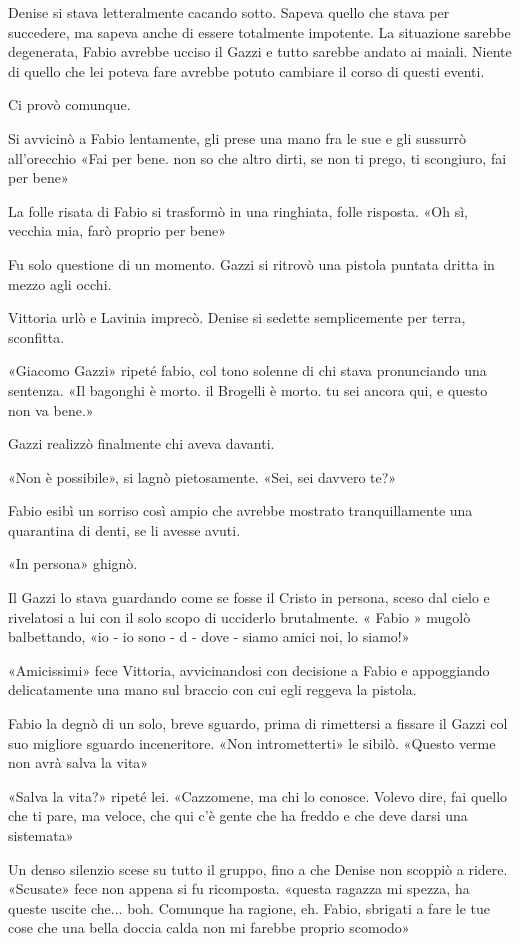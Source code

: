 Denise si stava letteralmente cacando sotto. Sapeva quello che stava per succedere, ma sapeva anche di essere totalmente impotente. La situazione sarebbe degenerata, Fabio avrebbe ucciso il Gazzi e tutto sarebbe andato ai maiali. Niente di quello che lei poteva fare avrebbe potuto cambiare il corso di questi eventi.

Ci provò comunque.

Si avvicinò a Fabio lentamente, gli prese una mano fra le sue e gli sussurrò all'orecchio «Fai per bene. non so che altro dirti, se non ti prego, ti scongiuro, fai per bene»

La folle risata di Fabio si trasformò in una ringhiata, folle risposta. «Oh sì, vecchia mia, farò proprio per bene»

Fu solo questione di un momento. Gazzi si ritrovò una pistola puntata dritta in mezzo agli occhi.

Vittoria urlò e Lavinia imprecò. Denise si sedette semplicemente per terra, sconfitta. 

«Giacomo Gazzi» ripeté fabio, col tono solenne di chi stava pronunciando una sentenza. «Il bagonghi è morto. il Brogelli è morto. tu sei ancora qui, e questo non va bene.» 

Gazzi realizzò finalmente chi aveva davanti.

«Non è possibile», si lagnò pietosamente. «Sei, sei davvero te?»

Fabio esibì un sorriso così ampio che avrebbe mostrato tranquillamente una quarantina di denti, se li avesse avuti.

«In persona» ghignò.

Il Gazzi lo stava guardando come se fosse il Cristo in persona, sceso dal cielo e rivelatosi a lui con il solo scopo di ucciderlo brutalmente. « Fabio » mugolò balbettando, «io - io sono - d - dove - siamo amici noi, lo siamo!»

«Amicissimi» fece Vittoria, avvicinandosi con decisione a Fabio e appoggiando delicatamente una mano sul braccio con cui egli reggeva la pistola.

Fabio la degnò di un solo, breve sguardo, prima di rimettersi a fissare il Gazzi col suo migliore sguardo inceneritore. «Non intrometterti» le sibilò. «Questo verme non avrà salva la vita»

«Salva la vita?» ripeté lei. «Cazzomene, ma chi lo conosce. Volevo dire, fai quello che ti pare, ma veloce, che qui c'è gente che ha freddo e che deve darsi una sistemata»

Un denso silenzio scese su tutto il gruppo, fino a che Denise non scoppiò a ridere. «Scusate» fece non appena si fu ricomposta. «questa ragazza mi spezza, ha queste uscite che... boh. Comunque ha ragione, eh. Fabio, sbrigati a fare le tue cose che una bella doccia calda non mi farebbe proprio scomodo»

